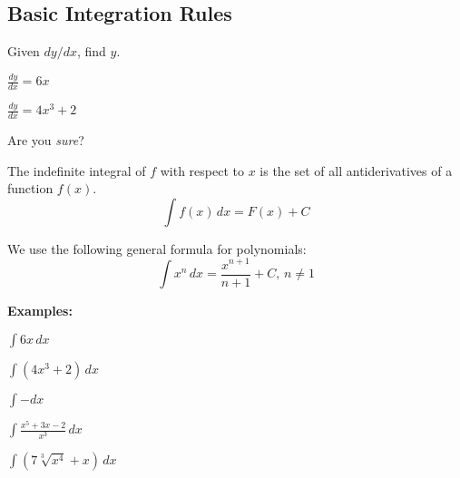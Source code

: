 \documentclass[addpoints, 12pt]{exam}
\begin{document}
\newpage
{}
\subsection*{Basic Integration Rules}
Given $dy/dx$, find $y$.
\begin{questions}
    \begin{minipage}{0.45\linewidth}
        \question $\displaystyle\frac{dy}{dx}=6x$
    \end{minipage}
    \hfill
    \begin{minipage}{0.45\linewidth}
        \question $\displaystyle\frac{dy}{dx}=4x^3+2$
    \end{minipage}
    
\end{questions}
Are you \textit{sure}?


\begin{tcolorbox}[title= DEFINITION OF THE INDEFINITE INTEGRAL,black,sharp corners,colback=white,colbacktitle=white,coltitle=black,boxrule=1pt]

    The indefinite integral of $f$ with respect to $x$ is the set of all antiderivatives of a function $f(x)$.
    \[\int f(x)\,dx=F(x)+C\]
    
\end{tcolorbox}

\begin{center}
    We use the following general formula for polynomials:
    \[\int x^n\,dx=\frac{x^{n+1}}{n+1}+C,\,n\ne1\]
\end{center}

\noindent\textbf{Examples:}
\begin{questions}
    \question $\displaystyle\int6x\,dx$
    
    \question $\displaystyle\int(4x^3+2)\,dx$
    
    \question $\displaystyle\int-dx$
    
    \question $\displaystyle\int\frac{x^5+3x-2}{x^3}\,dx$
    
    \newpage
    
    \question $\displaystyle\int\left(7\sqrt[3]{x^4}+x\right)\,dx$
\end{questions}
\end{document}
